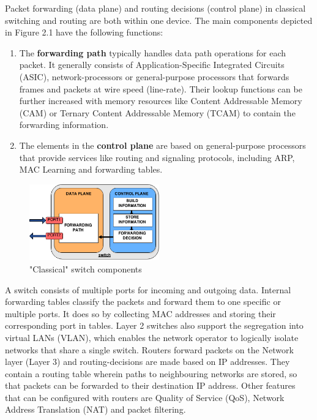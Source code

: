 Packet forwarding (data plane) and routing decisions (control plane) in classical switching and routing are both within one device. The main components depicted in Figure 2.1 have the following functions:
\begin{enumerate}
\item The \textbf{forwarding path} typically handles data path operations for each packet. It generally consists of Application-Specific Integrated Circuits (ASIC), network-processors or general-purpose processors that forwards frames and packets at wire speed (line-rate). Their lookup functions can be further increased with memory resources like Content Addressable Memory (CAM) or Ternary Content Addressable Memory (TCAM) to contain the forwarding information.
\item The elements in the \textbf{control plane} are based on general-purpose processors that provide services like routing and signaling protocols, including ARP, MAC Learning and forwarding tables.
\end{enumerate}

\begin{figure}[H]
\centering

\includegraphics[width=0.5\textwidth]{images/fundamentals/switch_components}

\caption{"Classical" switch components}
\end{figure}

A switch consists of multiple ports for incoming and outgoing data. Internal forwarding tables classify the packets and forward them to one specific or multiple ports. It does so by collecting MAC addresses and storing their corresponding port in tables. Layer 2 switches also support the segregation into virtual LANs (VLAN), which enables the network operator to logically isolate networks that share a single switch.
\newpage
Routers forward packets on the Network layer (Layer 3) and routing-decisions are made based on IP addresses. They contain a routing table wherein paths to neighbouring networks are stored, so that packets can be forwarded to their destination IP address. Other features that can be configured with routers are Quality of Service (QoS), Network Address Translation (NAT) and packet filtering.

